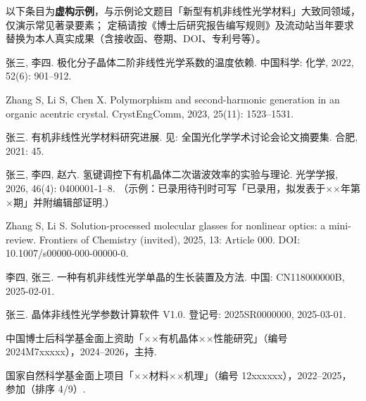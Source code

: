 \backmatter
\printbibliography[heading=bibintoc,title={参考文献}]

\begin{publications}
以下条目为\textbf{虚构示例}，与示例论文题目「新型有机非线性光学材料」大致同领域，仅演示常见著录要素；
定稿请按《博士后研究报告编写规则》及流动站当年要求替换为本人真实成果（含接收函、卷期、DOI、专利号等）。

\begin{swupubenum}
  \item 张三, 李四. 极化分子晶体二阶非线性光学系数的温度依赖.%
    中国科学: 化学, 2022, 52(6): 901--912.
  \item Zhang S, Li S, Chen X. Polymorphism and second-harmonic generation in an%
    organic acentric crystal. CrystEngComm, 2023, 25(11): 1523--1531.
  \item 张三. 有机非线性光学材料研究进展. 见: 全国光化学学术讨论会论文摘要集.%
    合肥, 2021: 45.
\end{swupubenum}

\begin{swupubenum}
  \item 张三, 李四, 赵六. 氢键调控下有机晶体二次谐波效率的实验与理论.%
    光学学报, 2026, 46(4): 0400001-1--8.
    （示例：已录用待刊时可写「已录用，拟发表于××年第×期」并附编辑部证明.）
  \item Zhang S, Li S. Solution-processed molecular glasses for nonlinear optics:%
    a mini-review. Frontiers of Chemistry (invited), 2025, 13: Article 000.%
    DOI: 10.1007/s00000-000-00000-0.
\end{swupubenum}

\begin{swupubenum}
  \item 李四, 张三. 一种有机非线性光学单晶的生长装置及方法.%
  中国: CN118000000B, 2025-02-01.
  \item 张三. 晶体非线性光学参数计算软件 V1.0. 登记号: 2025SR0000000, 2025-03-01.
\end{swupubenum}

\begin{swupubenum}
  \item 中国博士后科学基金面上资助「××有机晶体××性能研究」（编号 2024M7xxxxx），2024--2026，主持.
  \item 国家自然科学基金面上项目「××材料××机理」（编号 12xxxxxx），2022--2025，参加（排序 4/9）.
\end{swupubenum}
\end{publications}

